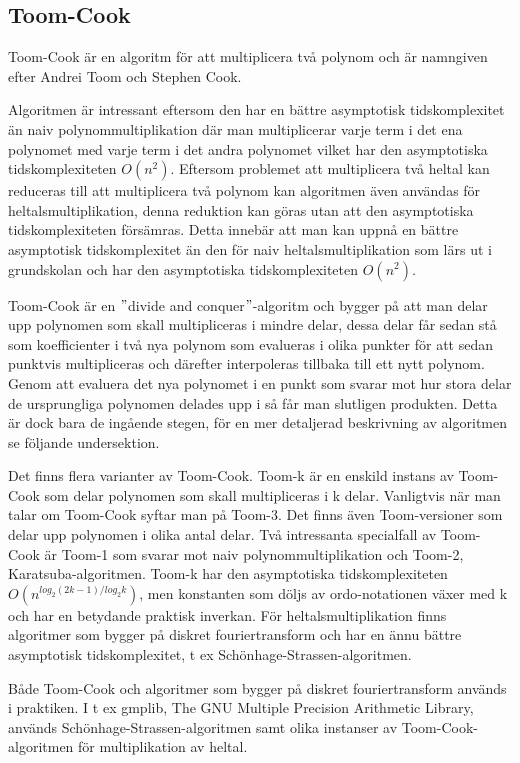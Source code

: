 \subsection{Toom-Cook}
Toom-Cook är en algoritm för att multiplicera två polynom och är namngiven
efter Andrei Toom och Stephen Cook.

Algoritmen är intressant eftersom den har en bättre asymptotisk tidskomplexitet
än naiv polynommultiplikation där man multiplicerar varje term i det ena
polynomet med varje term i det andra polynomet vilket har den asymptotiska
tidskomplexiteten $O\left(n^2\right)$. Eftersom problemet att multiplicera två
heltal kan reduceras till att multiplicera två polynom kan algoritmen även
användas för heltalsmultiplikation, denna reduktion kan göras utan att den
asymptotiska tidskomplexiteten försämras. Detta innebär att man kan uppnå en
bättre asymptotisk tidskomplexitet än den för naiv heltalsmultiplikation som
lärs ut i grundskolan och har den asymptotiska tidskomplexiteten
$O\left(n^2\right)$.

Toom-Cook är en $"$divide and conquer$"$-algoritm och bygger på att man delar
upp polynomen som skall multipliceras i mindre delar, dessa delar får sedan stå
som koefficienter i två nya polynom som evalueras i olika punkter för att sedan
punktvis multipliceras och därefter interpoleras tillbaka till ett nytt
polynom. Genom att evaluera det nya polynomet i en punkt som svarar mot hur
stora delar de ursprungliga polynomen delades upp i så får man slutligen
produkten. Detta är dock bara de ingående stegen, för en mer detaljerad
beskrivning av algoritmen se följande undersektion.

Det finns flera varianter
av Toom-Cook. Toom-k är en enskild instans av Toom-Cook som delar polynomen som
skall multipliceras i k delar. Vanligtvis när man talar om Toom-Cook syftar man
på Toom-3. Det finns även Toom-versioner som delar upp polynomen i olika antal
delar. Två intressanta specialfall av Toom-Cook är Toom-1 som svarar mot naiv
polynommultiplikation och Toom-2, Karatsuba-algoritmen. Toom-k har den
asymptotiska tidskomplexiteten $O(n^{log_2(2 k-1)/log_2 k})$, men konstanten
som döljs av ordo-notationen växer med k och har en betydande praktisk
inverkan. För heltalsmultiplikation finns algoritmer som bygger på diskret
fouriertransform och har en ännu bättre asymptotisk tidskomplexitet, t ex
Schönhage-Strassen-algoritmen.

Både Toom-Cook och algoritmer som bygger på diskret fouriertransform används i
praktiken. I t ex gmplib, The GNU Multiple Precision Arithmetic Library,
används Schönhage-Strassen-algoritmen samt olika instanser av
Toom-Cook-algoritmen för multiplikation av heltal.


